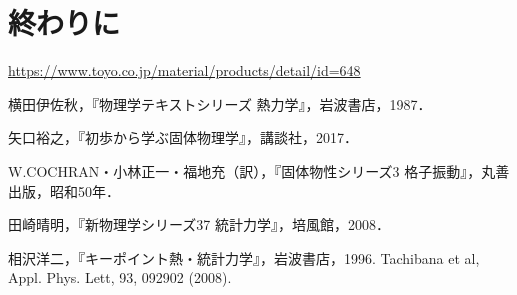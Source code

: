 \documentclass[10pt,b5paper,papersize,dvipdfmx]{jsbook}
\begin{document}
\section{終わりに}

\begin{thebibliography}{99}
   \url{https://www.toyo.co.jp/material/products/detail/id=648}
  \item 横田伊佐秋，『物理学テキストシリーズ 熱力学』，岩波書店，1987．
  \item 矢口裕之，『初歩から学ぶ固体物理学』，講談社，2017．
  \item W.COCHRAN・小林正一・福地充（訳），『固体物性シリーズ3 格子振動』，丸善出版，昭和50年．
  \item 田崎晴明，『新物理学シリーズ37 統計力学』，培風館，2008．
  \item 相沢洋二，『キーポイント熱・統計力学』，岩波書店，1996.
  Tachibana et al, Appl. Phys. Lett, 93, 092902 (2008).
\end{thebibliography}
\end{document}
